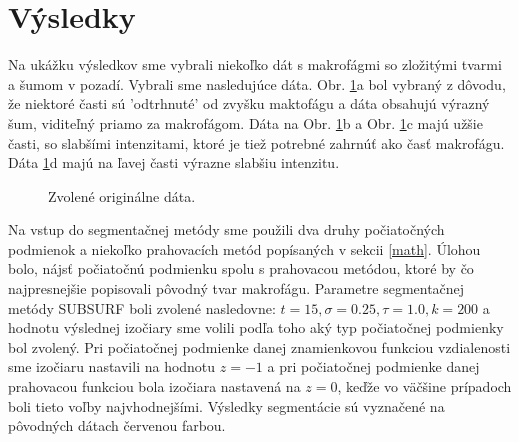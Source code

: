 \documentclass[a4paper,11pt,oneside]{article}%
\begin{document}
\newpage
\section{Výsledky}

Na ukážku výsledkov sme vybrali niekoľko dát s makrofágmi so zložitými tvarmi a šumom v pozadí. Vybrali sme nasledujúce dáta. Obr. \ref{fig:ogData}a bol vybraný z dôvodu, že niektoré časti sú 'odtrhnuté' od zvyšku maktofágu  a dáta obsahujú výrazný šum, viditeľný priamo za makrofágom. Dáta na Obr. \ref{fig:ogData}b a Obr. \ref{fig:ogData}c majú užšie časti, so slabšími intenzitami, ktoré je tiež potrebné zahrnúť ako časť makrofágu. Dáta \ref{fig:ogData}d majú na ľavej časti výrazne slabšiu intenzitu.

\begin{figure}[h!]  
    \hspace{5px}
    \hspace{5px}
    \hspace{5px}
    \caption{Zvolené originálne dáta.}
    \label{fig:ogData}
\end{figure}

Na vstup do segmentačnej metódy sme použili dva druhy počiatočných podmienok a niekoľko prahovacích metód popísaných v sekcii \ref{math}. Úlohou bolo, nájsť počiatočnú podmienku spolu s prahovacou metódou, ktoré by čo najpresnejšie popisovali pôvodný tvar makrofágu. Parametre segmentačnej metódy SUBSURF boli zvolené nasledovne:
$t = 15, \sigma = 0.25, \tau = 1.0, k = 200$ a hodnotu výslednej izočiary sme volili podľa toho aký typ počiatočnej podmienky bol zvolený. Pri počiatočnej podmienke danej znamienkovou funkciou vzdialenosti sme izočiaru nastavili na hodnotu $z = -1$ a pri počiatočnej podmienke danej prahovacou funkciou bola izočiara nastavená na $z = 0$, keďže vo väčšine prípadoch boli tieto voľby najvhodnejšími. Výsledky segmentácie sú vyznačené na pôvodných dátach červenou farbou. 
\end{document}
